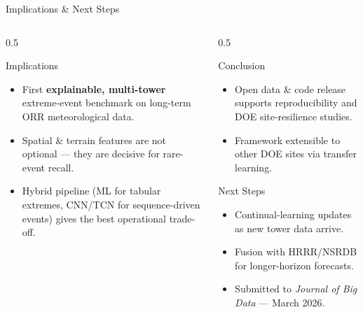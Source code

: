 \documentclass[aspectratio=169,10pt]{beamer}
\begin{document}
\begin{frame}{Implications \& Next Steps}
\begin{columns}[T]
  \begin{column}{0.5\textwidth}
    \begin{block}{Implications}
      \begin{itemize}
        \item First \textbf{explainable, multi-tower} extreme-event
              benchmark on long-term ORR meteorological data.
        \item Spatial \& terrain features are not optional ---
              they are decisive for rare-event recall.
        \item Hybrid pipeline (ML for tabular extremes,
              CNN/TCN for sequence-driven events) gives
              the best operational trade-off.
      \end{itemize}
    \end{block}
  \end{column}

  \begin{column}{0.5\textwidth}
    \begin{block}{Conclusion}
      \begin{itemize}
        \item Open data \& code release supports reproducibility
              and DOE site-resilience studies.
        \item Framework extensible to other DOE sites via
              transfer learning.
      \end{itemize}
    \end{block}
    \begin{block}{Next Steps}
      \begin{itemize}
        \item Continual-learning updates as new tower data arrive.
        \item Fusion with HRRR/NSRDB for longer-horizon forecasts.
        \item Submitted to \emph{Journal of Big Data} --- March 2026.
      \end{itemize}
    \end{block}
  \end{column}
\end{columns}
\end{frame}
\end{document}
